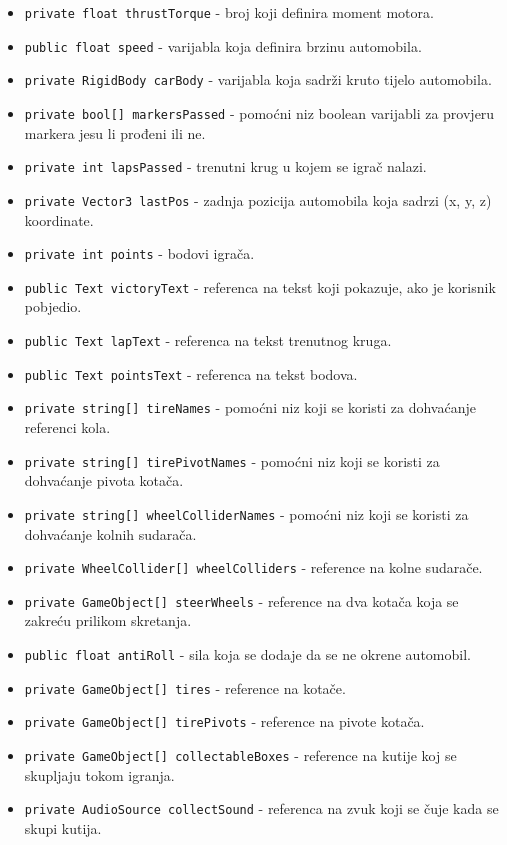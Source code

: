 \begin{itemize}
  \item \texttt{private float thrustTorque} - broj koji definira moment motora.
  \item \texttt{public float speed} - varijabla koja definira brzinu automobila.
  \item \texttt{private RigidBody carBody} - varijabla koja sadrži kruto tijelo automobila.
  \item \texttt{private bool[] markersPassed} - pomoćni niz boolean varijabli za provjeru markera jesu li prođeni ili ne.
  \item \texttt{private int lapsPassed} - trenutni krug u kojem se igrač nalazi.
  \item \texttt{private Vector3 lastPos} - zadnja pozicija automobila koja sadrzi (x, y, z) koordinate.
  \item \texttt{private int points} - bodovi igrača.
  \item \texttt{public Text victoryText} - referenca na tekst koji pokazuje, ako je korisnik pobjedio.
  \item \texttt{public Text lapText} - referenca na tekst trenutnog kruga.
  \item \texttt{public Text pointsText} - referenca na tekst bodova.
  \item \texttt{private string[] tireNames} - pomoćni niz koji se koristi za dohvaćanje referenci kola.
  \item \texttt{private string[] tirePivotNames} - pomoćni niz koji se koristi za dohvaćanje pivota kotača.
  \item \texttt{private string[] wheelColliderNames} - pomoćni niz koji se koristi za dohvaćanje kolnih sudarača.
  \item \texttt{private WheelCollider[] wheelColliders} - reference na kolne sudarače.
  \item \texttt{private GameObject[] steerWheels} - reference na dva kotača koja se zakreću prilikom skretanja.
  \item \texttt{public float antiRoll} - sila koja se dodaje da se ne okrene automobil.
  \item \texttt{private GameObject[] tires} - reference na kotače.
  \item \texttt{private GameObject[] tirePivots} - reference na pivote kotača.
  \item \texttt{private GameObject[] collectableBoxes} - reference na kutije koj se skupljaju tokom igranja.
  \item \texttt{private AudioSource collectSound} - referenca na zvuk koji se čuje kada se skupi kutija.
\end{itemize}
\newpage
